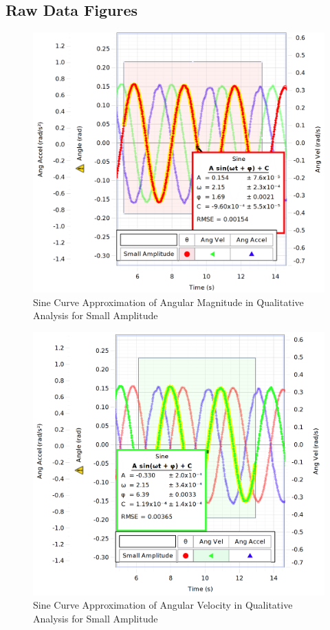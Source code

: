 \subsection{Raw Data Figures}
\begin{figure}[H]
  \centering\includegraphics[width=15cm]{figQualitativeSmallAngle.png}
  \caption{Sine Curve Approximation of Angular Magnitude in Qualitative Analysis for Small Amplitude}
  \label{figAngleQualitativeSmallAngle}
\end{figure}
\begin{figure}[H]
  \centering\includegraphics[width=15cm]{figQualitativeSmallAngle2.png}
  \caption{Sine Curve Approximation of Angular Velocity in Qualitative Analysis for Small Amplitude}
  \label{figAngleVelQualitativeSmallAngle}
\end{figure}
